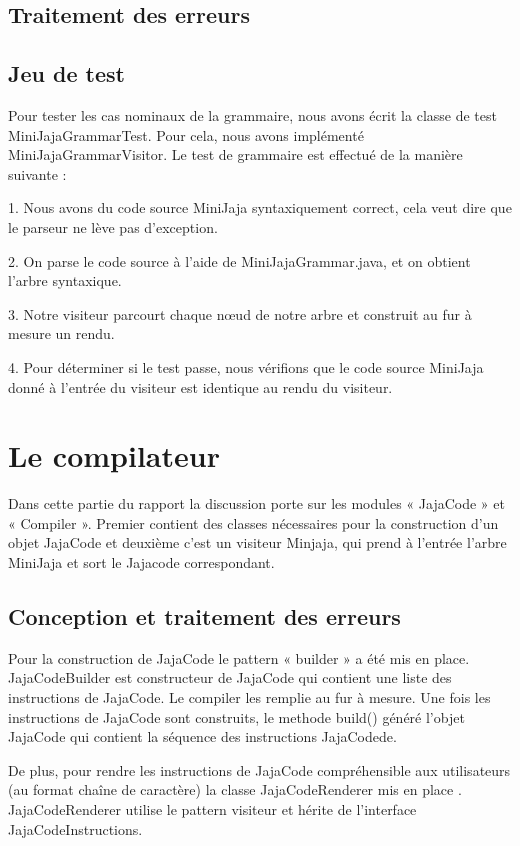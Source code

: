 \documentclass[a4paper,12pt]{report}
\begin{document}
\subsection{Traitement des erreurs}
\subsection{Jeu de test}
Pour tester les cas nominaux de la grammaire, nous avons écrit la classe de test MiniJajaGrammarTest. Pour cela, nous avons implémenté MiniJajaGrammarVisitor. Le test de grammaire est effectué de la manière suivante : 

1. Nous avons du code source MiniJaja syntaxiquement correct, cela veut dire que le parseur ne lève pas d'exception.

2. On parse le code source à l'aide de MiniJajaGrammar.java, et on obtient l'arbre syntaxique. 

3. Notre visiteur parcourt chaque nœud de notre arbre et construit au fur à mesure un rendu. 

4. Pour déterminer si le test passe, nous vérifions que le code source MiniJaja donné à l'entrée du visiteur est identique au rendu du visiteur.   

\section{Le compilateur}
Dans cette partie du rapport la discussion porte sur les modules  « JajaCode » et « Compiler ». Premier contient des classes nécessaires pour la construction d’un objet JajaCode et deuxième c’est un visiteur Minjaja, qui prend à l’entrée l’arbre MiniJaja et sort le Jajacode correspondant. 

\subsection{Conception et traitement des erreurs}
Pour la construction de JajaCode le pattern « builder » a été mis en place. JajaCodeBuilder est constructeur de JajaCode qui contient une liste des instructions de JajaCode. Le compiler les remplie au fur à mesure. Une fois les instructions de JajaCode sont construits, le methode build() généré l’objet JajaCode qui contient la séquence des instructions JajaCodede.
  
De plus, pour rendre les instructions de JajaCode compréhensible aux utilisateurs (au format chaîne de caractère) la classe JajaCodeRenderer mis en place . JajaCodeRenderer utilise le pattern visiteur et  hérite de l’interface JajaCodeInstructions. 
\end{document}
